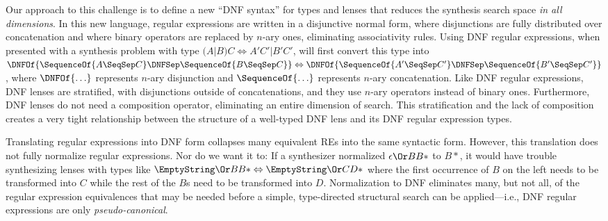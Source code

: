 \documentclass[sigplan,acmsmall]{acmart}
\begin{document}
Our approach to this challenge is to define a new ``DNF syntax'' for types
and lenses that reduces the synthesis search space \emph{in all dimensions}.
In this new language, regular expressions are written in a disjunctive normal
form, where disjunctions are fully distributed over concatenation and where binary
operators are replaced by $n$-ary ones, eliminating associativity rules.
Using DNF regular expressions, when presented with a synthesis problem with type
$(A | B) C \Leftrightarrow A' C' | B' C'$, \Optician{} will first convert this
type into $\DNFOf{\SequenceOf{A \SeqSep C} \DNFSep \SequenceOf{B
    \SeqSep C}} \Leftrightarrow
\DNFOf{\SequenceOf{A' \SeqSep C'} \DNFSep \SequenceOf{B' \SeqSep C'}}$, where
$\DNFOf{\ldots}$ represents $n$-ary disjunction and $\SequenceOf{\ldots}$
represents $n$-ary concatenation.
Like DNF regular expressions, DNF lenses are stratified, with disjunctions
outside of concatenations, and they use $n$-ary operators instead of binary
ones.  Furthermore, DNF lenses do not need a composition operator, eliminating
an entire dimension of search.  This stratification and the lack of
composition creates a very tight relationship between the structure of a well-typed
DNF lens and its DNF regular expression types.

Translating regular expressions into DNF form collapses many equivalent REs
into the same syntactic form.  However, this translation does not fully
normalize regular expressions.
Nor do we want it to: If a synthesizer normalized $\epsilon \Or BB*$ to $B*$, it
would have trouble synthesizing lenses with types like $\EmptyString \Or BB*
\Leftrightarrow \EmptyString \Or CD*$
where the first occurrence of $B$ on the left needs to be transformed into
$C$ while the rest of the $B$s need to be transformed into $D$.
Normalization to DNF eliminates many, but not all, of the regular expression
equivalences that may be needed before a simple, type-directed structural search
can be applied---i.e., DNF regular expressions are only
\emph{pseudo-canonical}.
\end{document}
